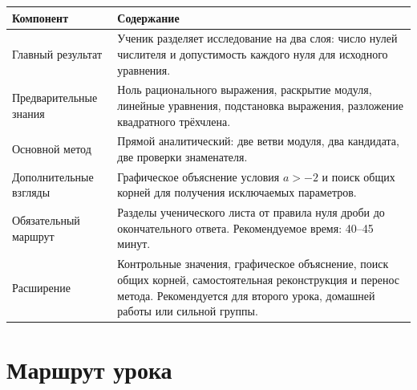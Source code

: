 \begin{center}
  \renewcommand{\arraystretch}{1.38}
  \begin{tabularx}{\textwidth}{
    >{\raggedright\arraybackslash}p{}
    >{\raggedright\arraybackslash}X}
    \toprule
    \rowcolor{TableHeader}
    Компонент & Содержание \\
    \midrule
    Главный результат
      & Ученик разделяет исследование на два слоя: число нулей
        числителя и допустимость каждого нуля для исходного уравнения. \\
    \addlinespace[0.25em]
    Предварительные знания
      & Ноль рационального выражения, раскрытие модуля, линейные уравнения,
        подстановка выражения, разложение квадратного трёхчлена. \\
    \addlinespace[0.25em]
    Основной метод
      & Прямой аналитический: две ветви модуля, два кандидата,
        две проверки знаменателя. \\
    \addlinespace[0.25em]
    Дополнительные взгляды
      & Графическое объяснение условия \(a>-2\) и поиск общих корней для
        получения исключаемых параметров. \\
    \addlinespace[0.25em]
    Обязательный маршрут
      & Разделы ученического листа от правила нуля дроби до окончательного
        ответа. Рекомендуемое время: 40--45 минут. \\
    \addlinespace[0.25em]
    Расширение
      & Контрольные значения, графическое объяснение, поиск общих корней,
        самостоятельная реконструкция и перенос метода. Рекомендуется для
        второго урока, домашней работы или сильной группы. \\
    \bottomrule
  \end{tabularx}
\end{center}

\section{Маршрут урока}

